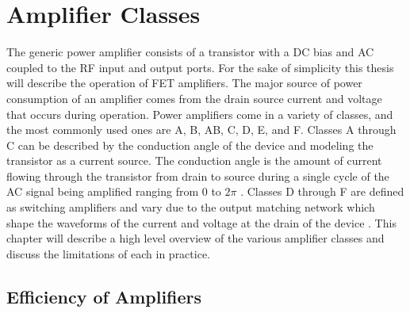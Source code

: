 \chapter{Amplifier Classes}
The generic power amplifier consists of a transistor with a DC bias and AC coupled to the RF input and output ports. For the sake of simplicity this thesis will describe the operation of FET amplifiers. The major source of power consumption of an amplifier comes from the drain source current and voltage that occurs during operation. Power amplifiers come in a variety of classes, and the most commonly used ones are A, B, AB, C, D, E, and F. Classes A through C can be described by the conduction angle of the device and modeling the transistor as a current source. The conduction angle is the amount of current flowing through the transistor from drain to source during a single cycle of the AC signal being amplified ranging from 0 to $2\pi$ \cite{Colantonio1998}. Classes D through F are defined as switching amplifiers and vary due to the output matching network which shape the waveforms of the current and voltage at the drain of the device \cite{Sokal1975}. This chapter will describe a high level overview of the various amplifier classes and discuss the limitations of each in practice.



\section{Efficiency of Amplifiers}


